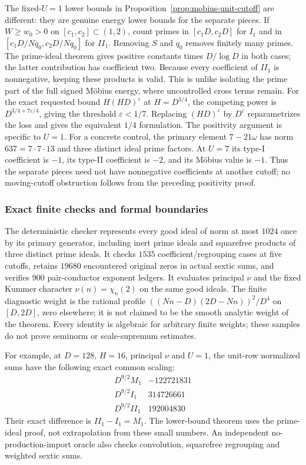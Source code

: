 \documentclass[11pt,oneside,openany]{book}
\theoremstyle{definition}\newtheorem{definition}[theorem]{Definition}
\theoremstyle{remark}\newtheorem{remark}[theorem]{Remark}
\begin{document}
The fixed-$U=1$ lower bounds in
Proposition~\ref{prop:mobius-unit-cutoff} are different: they are genuine
energy lower bounds for the separate pieces. If $W\ge w_0>0$ on
$[c_1,c_2]\subset(1,2)$, count primes in
$[c_1D,c_2D]$ for $I_1$ and in
$[c_1D/Nq_0,c_2D/Nq_0]$ for $II_1$. Removing $S$ and $q_0$ removes
finitely many primes. The prime-ideal theorem gives positive constants
times $D/\log D$ in both cases; the latter contribution has coefficient
two. Because every coefficient of $II_1$ is nonnegative, keeping these
products is valid. This is unlike isolating the prime part of the full
signed M\"obius energy, where uncontrolled cross terms remain.
For the exact requested bound $H(HD)^\varepsilon$ at $H=D^{3/4}$,
the competing power is $D^{3/4+7\varepsilon/4}$, giving the threshold
$\varepsilon<1/7$. Replacing $(HD)^\varepsilon$ by $D^\varepsilon$
reparametrizes the loss and gives the equivalent $1/4$ formulation.
The positivity argument is specific to $U=1$. For a concrete control,
the primary element $7-21\omega$ has norm $637=7\cdot7\cdot13$ and
three distinct ideal prime factors. At $U=7$ its type-I coefficient is
$-1$, its type-II coefficient is $-2$, and its M\"obius value is $-1$.
Thus the separate pieces need not have nonnegative coefficients at another
cutoff; no moving-cutoff obstruction follows from the preceding positivity
proof.

\subsubsection{Exact finite checks and formal boundaries}
The deterministic checker represents every good ideal of norm at most
$1024$ once by its primary generator, including inert prime ideals and
squarefree products of three distinct prime ideals.
It checks $1535$ coefficient/regrouping cases at five cutoffs, retains
$19680$ encountered original zeros in actual sextic sums, and verifies
$900$ pair-conductor exponent ledgers. It evaluates principal $\nu$ and
the fixed Kummer character $\nu(n)=\chi_n(2)$ on the same good ideals.
The finite diagnostic weight is the rational profile
$((Nn-D)(2D-Nn))^2/D^4$ on $[D,2D]$, zero elsewhere; it is not claimed
to be the smooth analytic weight of the theorem. Every identity is
algebraic for arbitrary finite weights; these samples do not prove
seminorm or scale-supremum estimates.

For example, at $D=128$, $H=16$, principal $\nu$ and $U=1$, the unit-row
normalized sums have the following exact common scaling:
\[
\begin{array}{c|r}
 D^{9/2}M_1&-122721831\\
 D^{9/2}I_1&314726661\\
 D^{9/2}II_1&192004830
\end{array}
\]
Their exact difference is $II_1-I_1=M_1$. The lower-bound theorem uses
the prime-ideal proof, not extrapolation from these small numbers.
An independent no-production-import oracle also checks convolution,
squarefree regrouping and weighted sextic sums.
\end{document}
